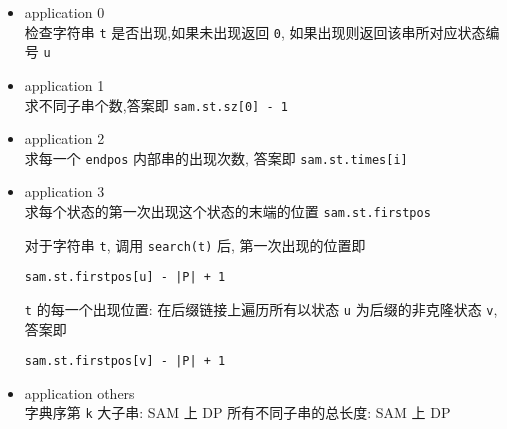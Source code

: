 \begin{itemize}
\item application 0\\
检查字符串 \verb|t| 是否出现,如果未出现返回 \verb|0|, 如果出现则返回该串所对应状态编号 \verb|u|

\item application 1\\
求不同子串个数,答案即 \verb|sam.st.sz[0] - 1|

\item application 2\\
求每一个 \verb|endpos| 内部串的出现次数, 答案即 \verb|sam.st.times[i]|

\item application 3\\
求每个状态的第一次出现这个状态的末端的位置 \verb|sam.st.firstpos|

对于字符串 \verb|t|, 调用 \verb|search(t)| 后, 第一次出现的位置即 \begin{verbatim}sam.st.firstpos[u] - |P| + 1\end{verbatim}

\verb|t| 的每一个出现位置: 在后缀链接上遍历所有以状态 \verb|u| 为后缀的非克隆状态 \verb|v|, 答案即 \begin{verbatim}sam.st.firstpos[v] - |P| + 1\end{verbatim}

\item application others\\
字典序第 \verb|k| 大子串: SAM 上 DP
所有不同子串的总长度: SAM 上 DP

\end{itemize}
